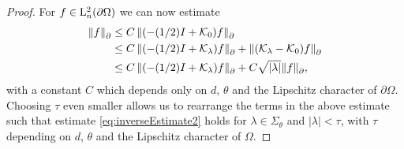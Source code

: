 \begin{proof}
  For $f \in \mathrm{L}^2_n(\partial\Omega)$ we can now estimate
  \begin{align*}
    \| f\|^{}_\partial 
    &\leq C\,  \|(-(1/2)I + \mathcal{K}_0) f \|^{}_\partial  \\
    &\leq C\,  \|(-(1/2)I + \mathcal{K}_\lambda)f \|^{}_\partial + \|(\mathcal{K}_\lambda - \mathcal{K}_0)f\|^{}_\partial \\
    &\leq C\,  \|(-(1/2)I + \mathcal{K}_\lambda)f\|^{}_\partial + C \sqrt{|\lambda|} \|f\|^{}_\partial,
  \end{align*}
  with a constant $C$ which depends only on $d$, $\theta$ and the Lipschitz character of $\partial\Omega$.
  Choosing $\tau$ even smaller allows us to rearrange the terms in the above estimate such that estimate \eqref{eq:inverseEstimate2} holds for $\lambda \in \Sigma_\theta$ and $|\lambda| < \tau$, with $\tau$ depending on $d$, $\theta$ and the Lipschitz character of $\Omega$.


\end{proof}
